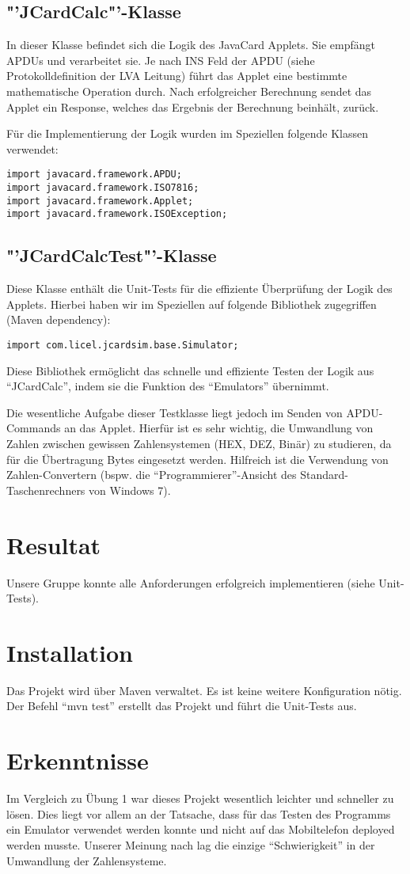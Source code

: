 \documentclass[paper=a4, fontsize=11pt]{scrartcl}
\begin{document}
\subsection{"'JCardCalc"'-Klasse}
In dieser Klasse befindet sich die Logik des JavaCard Applets. Sie empfängt APDUs und verarbeitet sie. Je nach INS Feld der APDU (siehe Protokolldefinition der LVA Leitung) führt das Applet eine bestimmte mathematische Operation durch. Nach erfolgreicher Berechnung sendet das Applet ein Response, welches das Ergebnis der Berechnung beinhält, zurück.

Für die Implementierung der Logik wurden im Speziellen folgende Klassen verwendet:
\begin{lstlisting}
import javacard.framework.APDU;
import javacard.framework.ISO7816;
import javacard.framework.Applet;
import javacard.framework.ISOException;
\end{lstlisting}

\subsection{"'JCardCalcTest"'-Klasse}
Diese Klasse enthält die Unit-Tests für die effiziente Überprüfung der Logik des Applets. Hierbei haben wir im Speziellen auf folgende Bibliothek zugegriffen (Maven dependency):
\begin{lstlisting}
import com.licel.jcardsim.base.Simulator;
\end{lstlisting}
Diese Bibliothek ermöglicht das schnelle und effiziente Testen der Logik aus "`JCardCalc"', indem sie die Funktion des "`Emulators"' übernimmt.

Die wesentliche Aufgabe dieser Testklasse liegt jedoch im Senden von APDU-Commands an das Applet. Hierfür ist es sehr wichtig, die Umwandlung von Zahlen zwischen gewissen Zahlensystemen (HEX, DEZ, Binär) zu studieren, da für die Übertragung Bytes eingesetzt werden. Hilfreich ist die Verwendung von Zahlen-Convertern (bspw. die "`Programmierer"'-Ansicht des Standard-Taschenrechners von Windows 7).

\section{Resultat}
Unsere Gruppe konnte alle Anforderungen erfolgreich implementieren (siehe Unit-Tests).

\section{Installation}
Das Projekt wird über Maven verwaltet. Es ist keine weitere Konfiguration nötig. Der Befehl "`mvn test"' erstellt das Projekt und führt die Unit-Tests aus.

\section{Erkenntnisse}
Im Vergleich zu Übung 1 war dieses Projekt wesentlich leichter und schneller zu lösen. Dies liegt vor allem an der Tatsache, dass für das Testen des Programms ein Emulator verwendet werden konnte und nicht auf das Mobiltelefon deployed werden musste.
Unserer Meinung nach lag die einzige "`Schwierigkeit"' in der Umwandlung der Zahlensysteme.
\end{document}
